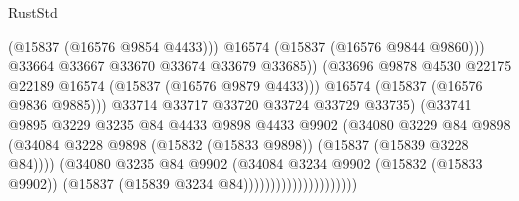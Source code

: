 \begin{lexlean}{RustStd}
\begin{coremodule}
                                                (@15837 (@16576 @9854 @4433)))
                                              @16574
                                              (@15837 (@16576 @9844 @9860)))
                                            @33664
                                            @33667
                                            @33670
                                            @33674
                                            @33679
                                            @33685))
                                        (@33696
                                          @9878
                                          @4530
                                          @22175
                                          @22189
                                          @16574
                                          (@15837 (@16576 @9879 @4433)))
                                        @16574
                                        (@15837 (@16576 @9836 @9885)))
                                      @33714
                                      @33717
                                      @33720
                                      @33724
                                      @33729
                                      @33735)
                                    (@33741
                                      @9895
                                      @3229
                                      @3235
                                      @84
                                      @4433
                                      @9898
                                      @4433
                                      @9902
                                      (@34080
                                        @3229
                                        @84
                                        @9898
                                        (@34084
                                          @3228
                                          @9898
                                          (@15832 (@15833 @9898))
                                          (@15837 (@15839 @3228 @84))))
                                      (@34080
                                        @3235
                                        @84
                                        @9902
                                        (@34084
                                          @3234
                                          @9902
                                          (@15832 (@15833 @9902))
                                          (@15837 (@15839 @3234 @84)))))))))))))))))))))

\end{coremodule}
\end{lexlean}
